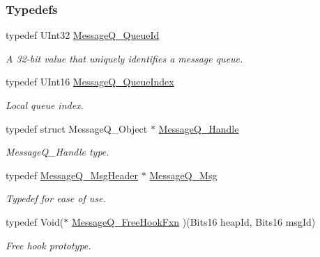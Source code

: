\subsubsection*{Typedefs}
\begin{DoxyCompactItemize}
\item 
typedef U\-Int32 \hyperlink{_message_q_8h_a34dd32b58cf0476c2d90e3f702843297}{Message\-Q\-\_\-\-Queue\-Id}
\begin{DoxyCompactList}\small\item\em A 32-\/bit value that uniquely identifies a message queue. \end{DoxyCompactList}\item 
typedef U\-Int16 \hyperlink{_message_q_8h_a22a5f41fd82f03f7c14f45dab647bada}{Message\-Q\-\_\-\-Queue\-Index}
\begin{DoxyCompactList}\small\item\em Local queue index. \end{DoxyCompactList}\item 
typedef struct Message\-Q\-\_\-\-Object $\ast$ \hyperlink{_message_q_8h_a1d584ce08733ca864d81e1e64a41cf7a}{Message\-Q\-\_\-\-Handle}
\begin{DoxyCompactList}\small\item\em Message\-Q\-\_\-\-Handle type. \end{DoxyCompactList}\item 
typedef \hyperlink{struct_message_q___msg_header}{Message\-Q\-\_\-\-Msg\-Header} $\ast$ \hyperlink{_message_q_8h_ab675d3cdd0443a1ad05658d375458204}{Message\-Q\-\_\-\-Msg}
\begin{DoxyCompactList}\small\item\em Typedef for ease of use. \end{DoxyCompactList}\item 
typedef Void($\ast$ \hyperlink{_message_q_8h_a23830422bfdc9ec8ca7df2d5a20c92ee}{Message\-Q\-\_\-\-Free\-Hook\-Fxn} )(Bits16 heap\-Id, Bits16 msg\-Id)
\begin{DoxyCompactList}\small\item\em Free hook prototype. \end{DoxyCompactList}\end{DoxyCompactItemize}
